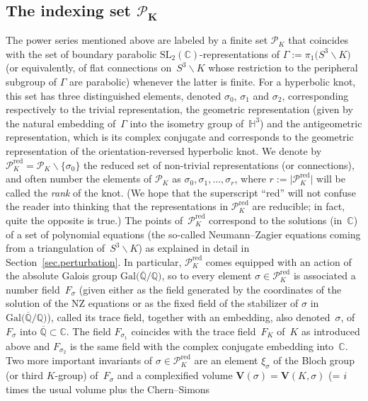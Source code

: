 \documentclass[11pt]{article}
\numberwithin{equation}{section}
\numberwithin{equation}{section}
\def\BQ{\mathbb Q}
\def\calP{\mathcal P}
\def\calP{\mathcal P}
\def\SL{\mathrm{SL}}
\def\C{\mathbb C}
\def\Q{\mathbb Q}
\def\G{\Gamma}
\def\s{\sigma}
\def\G{\Gamma}
\def\Qbar{\overline{\Q}}
\def\V{\mathbf V}
\def\ssm{\smallsetminus}
\def\RED{^{\text{red}}}
\begin{document}
\subsection[The indexing set P\_K]{The indexing set $\boldsymbol{\calP_K}$}
\label{sub.p}

The power series mentioned above are labeled by a finite set $\calP_K$
that coincides with the set of boundary parabolic $\SL_2(\C)$-representations
of $\G:=\pi_1\big(S^3\ssm K\big)$ (or equivalently, of flat connections
on~$S^3\ssm K$ whose restriction to the peripheral subgroup of $\G$ are
parabolic) whenever the latter is finite. For a hyperbolic knot, this
set has three distinguished elements, denoted $\s_0$, $\s_1$ and $\s_2$,
corresponding respectively to the trivial representation, the geometric
representation (given by the natural embedding of~$\G$ into the isometry group
of~$\mathbb H^3$) and the antigeometric representation, which is its
complex conjugate and corresponds to the geometric representation of the
orientation-reversed hyperbolic knot. We denote by $\calP\RED_K=\calP_K\ssm\{\s_0\}$
the reduced set of non-trivial representations (or connections), and often
number the elements of $\calP_K$ as $\s_0,\s_1,\dots,\s_r$, where
$r:=\big|\calP\RED_K\big|$ will be called the \emph{rank} of the knot. (We hope that the
superscript ``red'' will not confuse the reader into thinking that the representations
in $\calP\RED_K$ are reducible; in fact, quite the opposite is true.)
The points of~$\calP\RED_K$ correspond to the solutions (in~$\C$) of a set of polynomial
equations \big(the so-called Neumann--Zagier equations coming from a triangulation
of~$S^3\ssm K$\big) as explained in detail in Section~\ref{sec.perturbation}.
In particular, $\calP\RED_K$ comes equipped with an action of the absolute
Galois group $\text{Gal}\big(\overline{\BQ}/\BQ\big)$, so to every element
$\s \in \calP\RED_K$ is associated a number field~$F_\s$ \big(given either as the
field generated by the coordinates of the solution of the NZ equations or
as the fixed field of the stabilizer of $\s$ in $\text{Gal}\big(\Qbar/\BQ\big)$\big),
called its trace field, together with an embedding, also denoted~$\s$,
of~$F_\s$ into $\Qbar\subset\C$. The field $F_{\s_1}$
coincides with the trace field~$F_K$ of~$K$ as introduced above and
$F_{\s_2}$ is the same field with the complex conjugate embedding into~$\C$.
Two more important invariants of $\s\in\calP_K\RED$ are an element $\xi_\s$
of the Bloch group (or third $K$-group) of~$F_\s$ and a complexified
volume $\V(\s)=\V(K,\s)$ (= ${\rm i}$ times the usual volume plus the Chern--Simons
\end{document}

